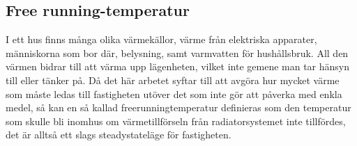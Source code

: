 \subsection{Free running-temperatur}
I ett hus finns många olika värmekällor, värme från elektriska apparater, människorna som bor där, belysning, samt varmvatten för hushållsbruk. All den värmen bidrar till att värma upp lägenheten, vilket inte gemene man tar hänsyn till eller tänker på. Då det här arbetet syftar till att avgöra hur mycket värme som måste ledas till fastigheten utöver det som inte gör att påverka med enkla medel, så kan en så kallad freerunningtemperatur definieras som den temperatur som skulle bli inomhus om värmetillförseln från radiatorsystemet inte tillfördes, det är alltså ett slags steadystateläge för fastigheten.

